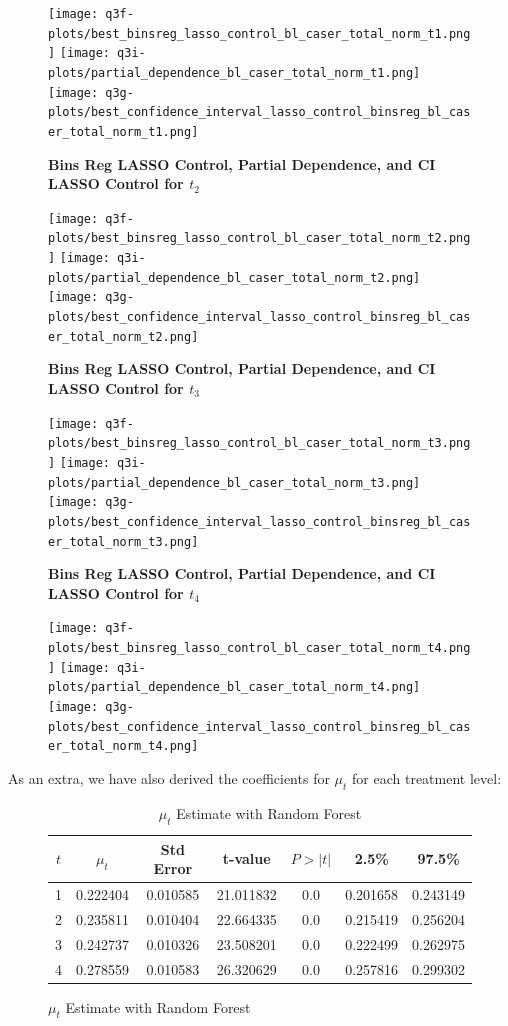\documentclass{article}
\begin{document}
{\begin{figure}[H]
  \texttt{[image: q3f-plots/best\_binsreg\_lasso\_control\_bl\_caser\_total\_norm\_t1.png]}
  \texttt{[image: q3i-plots/partial\_dependence\_bl\_caser\_total\_norm\_t1.png]}
  \texttt{[image: q3g-plots/best\_confidence\_interval\_lasso\_control\_binsreg\_bl\_caser\_total\_norm\_t1.png]}

  \textbf{Bins Reg LASSO Control, Partial Dependence, and CI LASSO Control for $t_2$}

  \texttt{[image: q3f-plots/best\_binsreg\_lasso\_control\_bl\_caser\_total\_norm\_t2.png]}
  \texttt{[image: q3i-plots/partial\_dependence\_bl\_caser\_total\_norm\_t2.png]}
  \texttt{[image: q3g-plots/best\_confidence\_interval\_lasso\_control\_binsreg\_bl\_caser\_total\_norm\_t2.png]}

  \textbf{Bins Reg LASSO Control, Partial Dependence, and CI LASSO Control for $t_3$}

  \texttt{[image: q3f-plots/best\_binsreg\_lasso\_control\_bl\_caser\_total\_norm\_t3.png]}
  \texttt{[image: q3i-plots/partial\_dependence\_bl\_caser\_total\_norm\_t3.png]}
  \texttt{[image: q3g-plots/best\_confidence\_interval\_lasso\_control\_binsreg\_bl\_caser\_total\_norm\_t3.png]}

  \textbf{Bins Reg LASSO Control, Partial Dependence, and CI LASSO Control for $t_4$}

  \texttt{[image: q3f-plots/best\_binsreg\_lasso\_control\_bl\_caser\_total\_norm\_t4.png]}
  \texttt{[image: q3i-plots/partial\_dependence\_bl\_caser\_total\_norm\_t4.png]}
  \texttt{[image: q3g-plots/best\_confidence\_interval\_lasso\_control\_binsreg\_bl\_caser\_total\_norm\_t4.png]}

\end{figure}
}

As an extra, we have also derived the coefficients for $\mu_t$ for each treatment level:

\begin{figure}[H]
  \begin{table}[H]
  \centering
  \begin{tabular}{|ccccccc|}
    \hline
    $t$ & $\mu_t$	& Std Error &	t-value	& $P>|t|$	& 2.5\%	& 97.5\% \\
    \hline
    1	& 0.222404 & 0.010585	& 21.011832	& 0.0 &	0.201658 & 0.243149 \\
    2	& 0.235811 & 0.010404	& 22.664335	& 0.0 &	0.215419 & 0.256204 \\
    3	& 0.242737 & 0.010326	& 23.508201	& 0.0 &	0.222499 & 0.262975 \\
    4	& 0.278559 & 0.010583	& 26.320629	& 0.0 &	0.257816 & 0.299302 \\
    \hline
  \end{tabular}
  \caption{$\mu_t$ Estimate with Random Forest}
\end{table}
\end{figure}
\end{document}
